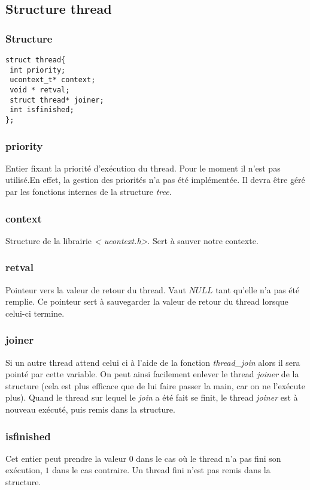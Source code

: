 \subsection{Structure thread}
\subsubsection{Structure}

\begin{verbatim}
struct thread{ 
 int priority;
 ucontext_t* context; 
 void * retval;
 struct thread* joiner; 
 int isfinished; 
};
\end{verbatim}

\subsubsection{priority}
Entier fixant la priorité d'exécution du thread. Pour le moment il
n'est pas utilisé.En effet, la gestion des priorités n'a pas été
implémentée.  Il devra être géré par les fonctions internes de la
structure \textit{tree}.

\subsubsection{context}
Structure de la librairie \textit{\textless
  ucontext.h\textgreater}. Sert à sauver notre contexte.
 
\subsubsection{retval}
Pointeur vers la valeur de retour du thread. Vaut $NULL$ tant qu'elle
n'a pas été remplie. Ce pointeur sert à sauvegarder la valeur de
retour du thread lorsque celui-ci termine.

\subsubsection{joiner}
Si un autre thread attend celui ci à l'aide de la fonction
\textit{thread\_join} alors il sera pointé par cette variable. On peut
ainsi facilement enlever le thread \textit{joiner} de la structure
(cela est plus efficace que de lui faire passer la main, car on ne
l'exécute plus). Quand le thread sur lequel le \textit{join} a été
fait se finit, le thread \textit{joiner} est à nouveau exécuté, puis
remis dans la structure.

\subsubsection{isfinished}
Cet entier peut prendre la valeur $0$ dans le cas où le thread n'a pas
fini son exécution, $1$ dans le cas contraire. Un thread fini n'est
pas remis dans la structure.


